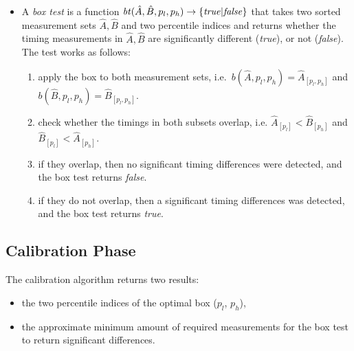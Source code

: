 \documentclass[12pt]{article}
\newcommand{\id}[1]{\mbox{\textit{#1}}}
\begin{document}
\begin{itemize}
  \item A \emph{box test} is a function $\id{bt}(\hat{A}, \hat{B}, p_l, p_h) \to \{\id{true}|\id{false}\}$ that takes two
    sorted measurement sets $\hat{A},\hat{B}$ and two percentile indices and returns whether the timing
    measurements in $\hat{A},\hat{B}$ are significantly different (\id{true}), or not (\id{false}).
    The test works as follows:
    \begin{enumerate}
        \item apply the box to both measurement sets, i.e.\ $b(\hat{A},p_l,p_h)=\hat{A}_{[p_l,p_h]}$ and $b(\hat{B},p_l,p_h)=\hat{B}_{[p_l,p_h]}$.
        \item check whether the timings in both subsets overlap, i.e. $\hat{A}_{[p_l]} < \hat{B}_{[p_h]}$ and $\hat{B}_{[p_l]} < \hat{A}_{[p_h]}$.
        \item if they overlap, then no significant timing differences were detected, and the box test returns \id{false}.
        \item if they do not overlap, then a significant timing differences was detected, and the box test returns \id{true}.
    \end{enumerate}

 \end{itemize}


\subsection{Calibration Phase}
The calibration algorithm returns two results:
\begin{itemize}
  \item the two percentile indices of the optimal box ($p_l$, $p_h$),
  \item the approximate minimum amount of required measurements for the box test to return significant differences.
\end{itemize}
\end{document}
